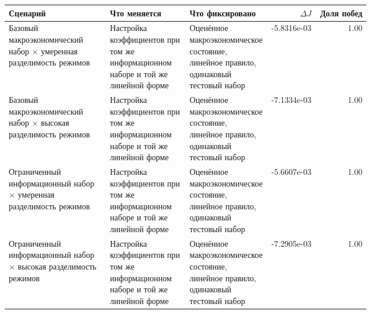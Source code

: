 \begin{tabular}{p{0.28\linewidth}p{0.22\linewidth}p{0.22\linewidth}rr}
\toprule
Сценарий & Что меняется & Что фиксировано & $\Delta J$ & Доля побед \\
\midrule
Базовый макроэкономический набор × умеренная разделимость режимов & Настройка коэффициентов при том же информационном наборе и той же линейной форме & Оценённое макроэкономическое состояние, линейное правило, одинаковый тестовый набор & -5.8316e-03 & 1.00 \\
Базовый макроэкономический набор × высокая разделимость режимов & Настройка коэффициентов при том же информационном наборе и той же линейной форме & Оценённое макроэкономическое состояние, линейное правило, одинаковый тестовый набор & -7.1334e-03 & 1.00 \\
Ограниченный информационный набор × умеренная разделимость режимов & Настройка коэффициентов при том же информационном наборе и той же линейной форме & Оценённое макроэкономическое состояние, линейное правило, одинаковый тестовый набор & -5.6607e-03 & 1.00 \\
Ограниченный информационный набор × высокая разделимость режимов & Настройка коэффициентов при том же информационном наборе и той же линейной форме & Оценённое макроэкономическое состояние, линейное правило, одинаковый тестовый набор & -7.2905e-03 & 1.00 \\
\bottomrule
\end{tabular}